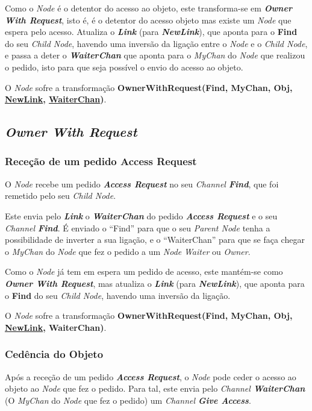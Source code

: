 Como o \emph{Node} é o detentor do acesso ao objeto, este transforma-se em \emph{\textbf{Owner With Request}},
isto é, é o detentor do acesso objeto mas existe um \emph{Node} que espera pelo acesso.
Atualiza o \textbf{\emph{Link}} (para \textbf{\emph{NewLink}}),
que aponta para o \textbf{Find} do seu \emph{Child Node}, havendo uma inversão da ligação entre o \emph{Node} e o \emph{Child Node},
e passa a deter o \textbf{\emph{WaiterChan}} que aponta para o \emph{MyChan} do \emph{Node} que realizou o pedido, isto para
que seja possível o envio do acesso ao objeto.


O \emph{Node} sofre a transformação \textbf{OwnerWithRequest(Find, MyChan, Obj, \underline{NewLink}, \underline{WaiterChan})}.



\subsection*{\emph{Owner With Request}}
\label{especificacao:nodes:owner_with_request}

\subsubsection*{Receção de um pedido Access Request}
O \emph{Node} recebe um pedido \emph{\textbf{Access Request}} no seu \emph{Channel \textbf{Find}},
que foi remetido pelo seu \emph{Child Node}.

Este envia pelo \textbf{\emph{Link}} o \textbf{\emph{WaiterChan}} do pedido \emph{\textbf{Access Request}} e o seu \emph{Channel \textbf{Find}}.
É enviado o ``Find'' para que o seu \emph{Parent Node} tenha a possibilidade de inverter a sua ligação, 
e o ``WaiterChan'' para que se faça chegar o \emph{MyChan} do \emph{Node} que fez o pedido a um \emph{Node} \emph{Waiter} ou \emph{Owner}.

Como o \emph{Node} já tem em espera um pedido de acesso, este mantém-se como \emph{\textbf{Owner With Request}},
mas atualiza o \textbf{\emph{Link}} (para \textbf{\emph{NewLink}}),
que aponta para o \textbf{Find} do seu \emph{Child Node}, havendo uma inversão da ligação.

O \emph{Node} sofre a transformação \textbf{OwnerWithRequest(Find, MyChan, Obj, \underline{NewLink}, WaiterChan)}.


\subsubsection*{Cedência do Objeto}
Após a receção de um pedido \emph{\textbf{Access Request}}, o \emph{Node} pode ceder o acesso ao objeto ao \emph{Node} que fez o pedido.
Para tal, este envia pelo \emph{Channel \textbf{WaiterChan}} (O \emph{MyChan} do \emph{Node} que fez o pedido) um \emph{Channel \textbf{Give Access}}.

